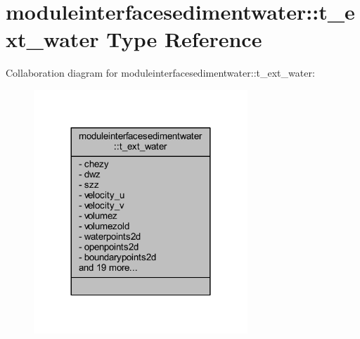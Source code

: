 \hypertarget{structmoduleinterfacesedimentwater_1_1t__ext__water}{}\section{moduleinterfacesedimentwater\+:\+:t\+\_\+ext\+\_\+water Type Reference}
\label{structmoduleinterfacesedimentwater_1_1t__ext__water}


Collaboration diagram for moduleinterfacesedimentwater\+:\+:t\+\_\+ext\+\_\+water\+:\nopagebreak
\begin{figure}[H]
\begin{center}
\leavevmode
\includegraphics[width=228pt]{structmoduleinterfacesedimentwater_1_1t__ext__water__coll__graph}
\end{center}
\end{figure}

